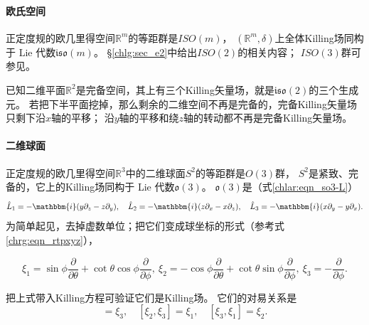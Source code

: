 \paragraph{欧氏空间}
正定度规的欧几里得空间$\mathbb{R}^m$的等距群是$ISO(m)$，
$(\mathbb{R}^m,\delta)$上全体Killing场同构于 Lie 代数$\mathfrak{iso}(m)$。
\S\ref{chlg:sec_e2}中给出$ISO(2)$的相关内容；
$ISO(3)$群可参见\parencite[\S 9.6]{tung-1985}。


\begin{example}\label{chlg:exm_incomplete-iso2}
    已知二维平面$\mathbb{R}^2$是完备空间，其上有三个Killing矢量场，就是$\mathfrak{iso}(2)$的三个生成元。
    若把下半平面挖掉，那么剩余的二维空间不再是完备的，完备Killing矢量场只剩下沿$x$轴的平移；
    沿$y$轴的平移和绕$z$轴的转动都不再是完备Killing矢量场。
\end{example}

\paragraph{二维球面}\label{chlg:sec_S2}
正定度规的欧几里得空间$\mathbb{R}^3$中的二维球面$S^2$的等距群是$O(3)$群，
$S^2$是紧致、完备的，它上的Killing场同构于 Lie 代数$\mathfrak{o}(3)$。
$\mathfrak{o}(3)$是（式\eqref{chlar:eqn_so3-L}）
\begin{equation*}
        \hat{L}_1 = -\mathbbm{i} (y \partial_z - z \partial_y ), \quad
        \hat{L}_2 = -\mathbbm{i} (z \partial_x - x \partial_z ), \quad
        \hat{L}_3 = -\mathbbm{i} (x \partial_y - y \partial_x ).
\end{equation*}
为简单起见，去掉虚数单位；把它们变成球坐标的形式（参考式\eqref{chrg:eqn_rtpxyz}），
\begin{small}
\begin{equation}\label{chlg:eqn_S2-killing}
    \xi_1= \sin\phi \frac{\partial }{\partial \theta} + \cot\theta \cos\phi \frac{\partial }{\partial \phi},\
    \xi_2=-\cos\phi\frac{\partial }{\partial \theta}+\cot\theta\sin\phi \frac{\partial }{\partial \phi},\
    \xi_3=-\frac{\partial }{\partial \phi} .
\end{equation}
\end{small}
把上式带入Killing方程可验证它们是Killing场。
它们的对易关系是
\begin{equation}
    [\xi_1, \xi_2] = \xi_3, \quad
    [\xi_2, \xi_3] = \xi_1, \quad
    [\xi_3, \xi_1] = \xi_2 .
\end{equation}





